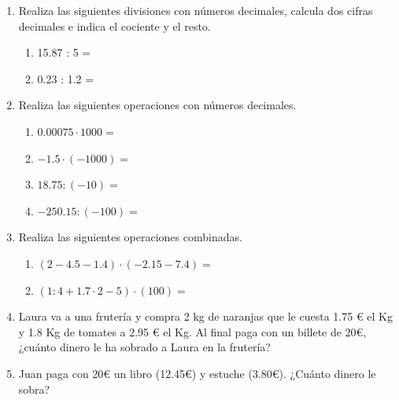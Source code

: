 \documentclass[a4paper,12pt]{article}
\begin{document}
\begin{enumerate}
\begin{enumerate}
            \end{enumerate}
        \item Realiza las siguientes divisiones con números decimales, calcula dos cifras decimales e indica el cociente y el resto. 
            \begin{enumerate}
                \item 15.87 : 5 = 
                \item 0.23 : 1.2 =
            \end{enumerate}
        \item Realiza las siguientes operaciones con números decimales.
            \begin{enumerate}
                \item $0.00075  \cdot 1000= $
                \item $-1.5 \cdot (-1000)=$
                \item $18.75 : (-10)=$
                \item $-250.15 : (-100)=$
            \end{enumerate}
        \item Realiza las siguientes operaciones combinadas.
            \begin{enumerate}
                \item $(2-4.5-1.4) \cdot (-2.15-7.4) = $
                \item $(1:4+1.7 \cdot2 -5) \cdot(100)=$
            \end{enumerate}
        \item Laura va a una frutería y compra 2 kg de naranjas que le cuesta 1.75 € el Kg y 1.8 Kg de tomates a 2.95 € el Kg. Al final paga con un billete de 20€, ¿cuánto dinero le ha sobrado a Laura en la frutería?
        \item Juan paga con 20€ un libro (12.45€) y estuche (3.80€). ¿Cuánto dinero le sobra?
    \end{enumerate}
\end{document}
